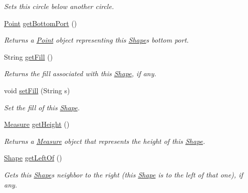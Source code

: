 \begin{DoxyCompactItemize}
\begin{DoxyCompactList}\small\item\em Sets this circle below another circle. \end{DoxyCompactList}\item 
\hyperlink{classcom_1_1aarrelaakso_1_1drawl_1_1_point}{Point} \hyperlink{classcom_1_1aarrelaakso_1_1drawl_1_1_shape_aba14efe9a16c0808580963c66b171082}{get\+Bottom\+Port} ()
\begin{DoxyCompactList}\small\item\em Returns a \hyperlink{classcom_1_1aarrelaakso_1_1drawl_1_1_point}{Point} object representing this \hyperlink{classcom_1_1aarrelaakso_1_1drawl_1_1_shape}{Shape}\textquotesingle{}s bottom port. \end{DoxyCompactList}\item 
String \hyperlink{classcom_1_1aarrelaakso_1_1drawl_1_1_shape_a0d9a33a3e151aaceeec140bea343a650}{get\+Fill} ()
\begin{DoxyCompactList}\small\item\em Returns the fill associated with this \hyperlink{classcom_1_1aarrelaakso_1_1drawl_1_1_shape}{Shape}, if any. \end{DoxyCompactList}\item 
void \hyperlink{classcom_1_1aarrelaakso_1_1drawl_1_1_shape_a2a2868c85bfbf4d2940d929950001b3d}{set\+Fill} (String s)
\begin{DoxyCompactList}\small\item\em Set the fill of this \hyperlink{classcom_1_1aarrelaakso_1_1drawl_1_1_shape}{Shape}. \end{DoxyCompactList}\item 
\hyperlink{classcom_1_1aarrelaakso_1_1drawl_1_1_measure}{Measure} \hyperlink{classcom_1_1aarrelaakso_1_1drawl_1_1_shape_ac9f74d31c332aab76b329edc22080e67}{get\+Height} ()
\begin{DoxyCompactList}\small\item\em Returns a \hyperlink{classcom_1_1aarrelaakso_1_1drawl_1_1_measure}{Measure} object that represents the height of this \hyperlink{classcom_1_1aarrelaakso_1_1drawl_1_1_shape}{Shape}. \end{DoxyCompactList}\item 
\hyperlink{classcom_1_1aarrelaakso_1_1drawl_1_1_shape}{Shape} \hyperlink{classcom_1_1aarrelaakso_1_1drawl_1_1_shape_a2b19d5964ac46d545a7bae3133df6532}{get\+Left\+Of} ()
\begin{DoxyCompactList}\small\item\em Gets this \hyperlink{classcom_1_1aarrelaakso_1_1drawl_1_1_shape}{Shape}\textquotesingle{}s neighbor to the right (this \hyperlink{classcom_1_1aarrelaakso_1_1drawl_1_1_shape}{Shape} is to the left of that one), if any. \end{DoxyCompactList}\item 

\end{DoxyCompactItemize}
